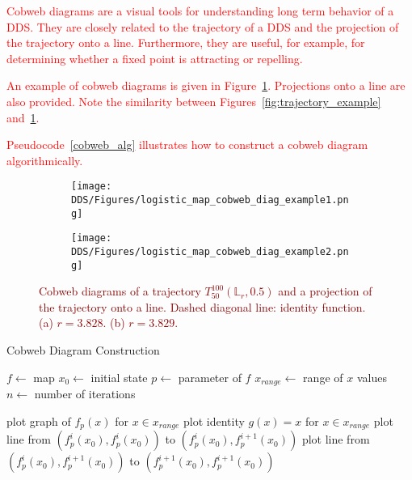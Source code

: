 \label{def:cobweb}
\begin{remark}
    \textcolor{red}{
    Cobweb diagrams are a visual tools for understanding long term behavior of a DDS.
    They are closely related to the trajectory of a DDS and the projection of the trajectory onto a line.
    Furthermore, they are useful, for example, for determining whether a fixed point is attracting or repelling.
    }
    \par
    \textcolor{red}{
    An example of cobweb diagrams is given in Figure~\ref{fig:cobweb_diag_example}.
    Projections onto a line are also provided.
    Note the similarity between Figures~\ref{fig:trajectory_example} and~\ref{fig:cobweb_diag_example}.
    }
    \par
    \textcolor{red}{
    Pseudocode~\ref{cobweb_alg} illustrates how to construct a cobweb diagram algorithmically.
    }
\end{remark}

\begin{figure}[!h]
    \centering
    \begin{subfigure}{0.6\textwidth}
        \centering
        \texttt{[image: DDS/Figures/logistic\_map\_cobweb\_diag\_example1.png]}
        \caption{}
    \end{subfigure}
    \hfill
    \begin{subfigure}{0.6\textwidth}
        \centering
        \texttt{[image: DDS/Figures/logistic\_map\_cobweb\_diag\_example2.png]}
        \caption{}
    \end{subfigure}

    \caption{
        \textcolor{darkred}{
        Cobweb diagrams of a trajectory $T_{50}^{100}(\mathbb{L}_{r}, 0.5)$ and a projection of the trajectory onto a line. 
        Dashed diagonal line: identity function. 
        (a) $r = 3.828$. 
        (b) $r = 3.829$. 
        }
        }
    \label{fig:cobweb_diag_example}
\end{figure}


\begin{algorithm}
\caption{Cobweb Diagram Construction}\label{cobweb_alg}
\begin{algorithmic}[1]
\Statex $f \gets$ map
\Statex $x_0 \gets$ initial state
\Statex $p \gets$ parameter of $f$
\Statex $x_{range} \gets$ range of $x$ values
\Statex $n \gets$ number of iterations

\State plot graph of $f_p(x)$ for $x \in x_{range}$
\State plot identity $g(x)=x$ for $x \in x_{range}$
\State plot line from $(f_{p}^{i}(x_0), f_{p}^{i}(x_0))$ to $(f_{p}^{i}(x_0), f_{p}^{i+1}(x_0))$
\State plot line from $(f_{p}^{i}(x_0), f_{p}^{i+1}(x_0))$ to $(f_{p}^{i+1}(x_0), f_{p}^{i+1}(x_0))$
\EndFor

\end{algorithmic}
\end{algorithm}

